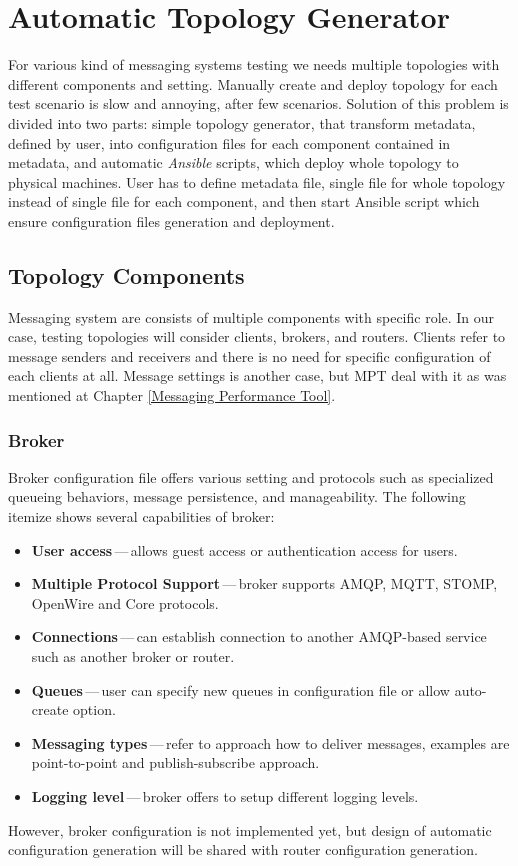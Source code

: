 \section{Automatic Topology Generator}
For various kind of messaging systems testing we needs multiple topologies with different components and setting. Manually create and deploy topology for each test scenario is slow and annoying, after few scenarios. Solution of this problem is divided into two parts: simple topology generator, that transform metadata, defined by user, into configuration files for each component contained in metadata, and automatic \emph{Ansible} scripts, which deploy whole topology to physical machines. User has to define metadata file, single file for whole topology instead of single file for each component, and then start Ansible script which ensure configuration files generation and deployment.


\subsection{Topology Components}
Messaging system are consists of multiple components with specific role. In our case, testing topologies will consider clients, brokers, and routers. Clients refer to message senders and receivers and there is no need for specific configuration of each clients at all. Message settings is another case, but MPT deal with it as was mentioned at Chapter \ref{Messaging Performance Tool}.

\subsubsection*{Broker}
Broker configuration file offers various setting and protocols such as specialized queueing behaviors, message persistence, and manageability. The following itemize shows several capabilities of broker:

\begin{itemize}
	\setlength\itemsep{0em}
	\item \textbf{User access}\,---\,allows guest access or authentication access for users. 
	\item \textbf{Multiple Protocol Support}\,---\,broker supports AMQP, MQTT, STOMP, OpenWire and Core protocols.
	\item \textbf{Connections}\,---\,can establish connection to another AMQP-based service such as another broker or router.
	\item \textbf{Queues}\,---\,user can specify new queues in configuration file or allow auto-create option.
	\item \textbf{Messaging types}\,---\,refer to approach how to deliver messages, examples are point-to-point and publish-subscribe approach.
	\item \textbf{Logging level}\,---\,broker offers to setup different logging levels.
\end{itemize}
However, broker configuration is not implemented yet, but design of automatic configuration generation will be shared with router configuration generation.

